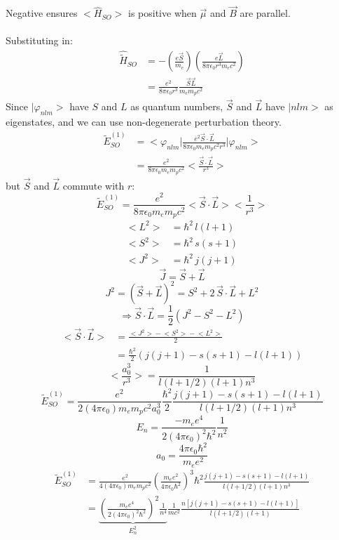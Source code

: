 \documentclass[12pt,fancychapters]{report}
\numberwithin{equation}{section}
\begin{document}
Negative ensures $\big<\hat{H}_{SO} \big>$ is positive when $\vec{\mu}$ and $\vec{B}$ are 
parallel.\\
\\
Substituting in: 
\begin{align*}
  \hat{\tilde{H}}_{SO} &= -\left(\frac{e\vec{S}}{m_e} \right)\left(\frac{e\vec{L}}
  {8\pi\epsilon_0 r^3 m_e c^2} \right)\\
                       &= \frac{e^2}{8\pi \epsilon_0 r^3}\frac{\vec{S}\vec{L}}{m_e m_p c^2}
\end{align*}
Since $\big|\varphi_{nlm} \big>$ have $S$ and $L$ as quantum numbers, $\vec{S}$ and $\vec{L}$
 have $\big|nlm \big>$ as eigenstates, and we can use non-degenerate perturbation theory.
 \begin{align*}
   \tilde{E}^{(1)}_{SO} &= \bigg<\varphi_{nlm}\bigg| \frac{e^2 \vec{S}\cdot\vec{L}}
   {8\pi \epsilon_0 m_e m_p c^2 r^3}\bigg|\varphi_{nlm}\bigg>\\
                        &= \frac{e^2}{8\pi\epsilon_0 m_e m_p c^2}
                        \bigg< \frac{\vec{S}\cdot\vec{L}}{r^3}\bigg>
 \end{align*}
 but $\vec{S}$ and $\vec{L}$ commute with $r$:
 \[
 \tilde{E}^{(1)}_{SO}=\frac{e^2}{8\pi\epsilon_0 m_e m_p c^2}
\bigg<\vec{S}\cdot\vec{L}\bigg>\bigg<\frac{1}{r^3}\bigg>
 \]
\begin{align*}
  \big<L^2\big>  &= \hbar^2\, l(l + 1)\\
  \big<S^2\big> &= \hbar^2\, s(s+1)\\
  \big< J^2\big> &= \hbar^2\,j(j+1)
\end{align*}
\[
  \vec{J} = \vec{S} + \vec{L}
\]
\[
  J^2 =\left(\vec{S} + \vec{L}\right)^2 = S^2 + 2\,\vec{S}\cdot \vec{L} + L^2 
\]
\[
  \Rightarrow \vec{S}\cdot\vec{L} = \frac{1}{2}\left(J^2 - S^2 - L^2\right)
\]
\begin{align*}
  \big<\vec{S}\cdot \vec{L} \big> &= \frac{\big<J^2\big> - \big<S^2\big> - \big<L^2\big>}
  {2}\\
  &= \frac{\hbar^2}{2}\left(j(j+1) - s(s+1)- l(l+1)\right)
\end{align*}
\[
  \bigg< \frac{a_0^3}{r^3}\bigg> = \frac{1}{l(l+1/2)(l+1)n^3}
\]
\[
  \tilde{E}^{(1)}_{SO} = \frac{e^2}{2(4\pi\epsilon_0)m_e m_p c^2 a_0^3}\frac{\hbar^2}{2}
  \frac{j(j+1) - s(s+1)- l(l+1)}{l(l+1/2)(l+1)n^3}
\]
\[
  E_n = \frac{-m_e e^4}{2(4\pi\epsilon_0)^2\hbar^2}\frac{1}{n^2}
\]
\[
  a_0 = \frac{4\pi \epsilon_0 \hbar^2}{m_e e^2}
\]
\begin{align*}
  \tilde{E}^{(1)}_{SO} &= \frac{e^2}{4(4\pi\epsilon_0)m_e m_p c^2}\left(\frac{m_e e^2}
  {4\pi\epsilon_0\hbar^2}\right)^3
 \hbar^2\frac{j(j+1) - s(s+1)- l(l+1)}{l(l+1/2)(l+1)n^3}\\
  &= \underbrace{\left(\frac{m_e e^4}{2(4\pi\epsilon_0)^2 \hbar^2}\right)^2 \frac{1}{n^4}}
  _{E_n^2}
  \frac{1}{mc^2}\frac{n[j(j+1) - s(s+1)- l(l+1) ]}{ l(l+1/2)(l+1) }
  \end{align*}
\end{document}
